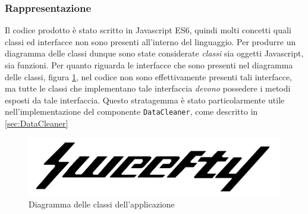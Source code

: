 \subsubsection{Rappresentazione}
Il codice prodotto è stato scritto in Javascript ES6, quindi molti concetti quali classi ed interfacce non sono presenti all'interno del linguaggio. Per produrre un diagramma delle classi dunque sono state considerate \emph{ classi } sia oggetti Javascript, sia funzioni. Per quanto riguarda le interfacce che sono presenti nel diagramma delle classi, figura \ref{img:diagrammaClassiClient}, nel codice non sono effettivamente presenti tali interfacce, ma tutte le classi che implementano tale interfaccia \emph{devono} possedere i metodi esposti da tale interfaccia. Questo stratagemma è stato particolarmente utile nell'implementazione del componente \texttt{DataCleaner}, come descritto in \ref{sec:DataCleaner}

\begin{figure}[H]
    \centering
    \includegraphics[width=1\textwidth]{Images/logo.jpg}
    \caption{Diagramma delle classi dell'applicazione}
    \label{img:diagrammaClassiClient}
\end{figure}

